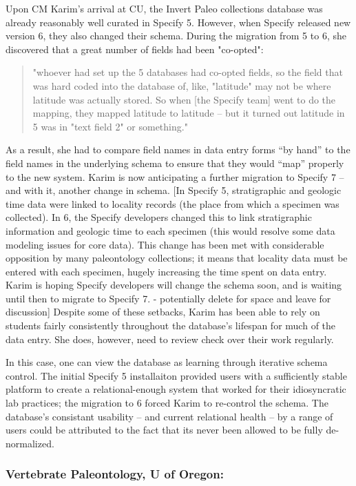 Upon CM Karim's arrival at CU, the Invert Paleo collections database was already reasonably well curated in Specify 5.  However, when Specify released new version 6, they also changed their schema. During the migration from 5 to 6, she discovered that a great number of fields had been "co-opted":
\begin{quote}
"whoever had set up the 5 databases had co-opted fields, so the field that was hard coded into the database of, like, "latitude" may not be where latitude was actually stored.  So when [the Specify team] went to do the mapping, they mapped latitude to latitude -- but it turned out latitude in 5 was in "text field 2" or something." 
\end{quote}
As a result, she had to compare field names in data entry forms “by hand” to the field names in the underlying schema to ensure that they would “map” properly to the new system. Karim is now anticipating a further migration to Specify 7 – and with it, another change in schema. [In Specify 5, stratigraphic and geologic time data were linked to locality records (the place from which a specimen was collected). In 6, the Specify developers changed this to link stratigraphic information and geologic time to each specimen (this would resolve some data modeling issues for core data). This change has been met with considerable opposition by many paleontology collections; it means that locality data must be entered with each specimen, hugely increasing the time spent on data entry. Karim is hoping Specify developers will change the schema soon, and is waiting until then to migrate to Specify 7. - potentially delete for space and leave for discussion] Despite some of these setbacks, Karim has been able to rely on students fairly consistently throughout the database's lifespan for much of the data entry. She does, however, need to review check over their work regularly.

In this case, one can view the database as learning through iterative schema control. The initial Specify 5 installaiton provided users with a sufficiently stable platform to create a relational-enough system that worked for their idiosyncratic lab practices; the migration to 6 forced Karim to re-control the schema.  The database's consistant usability -- and current relational health -- by a range of users could be attributed to the fact that its never been allowed to be fully de-normalized.

\subsubsection{Vertebrate Paleontology, U of Oregon:}

